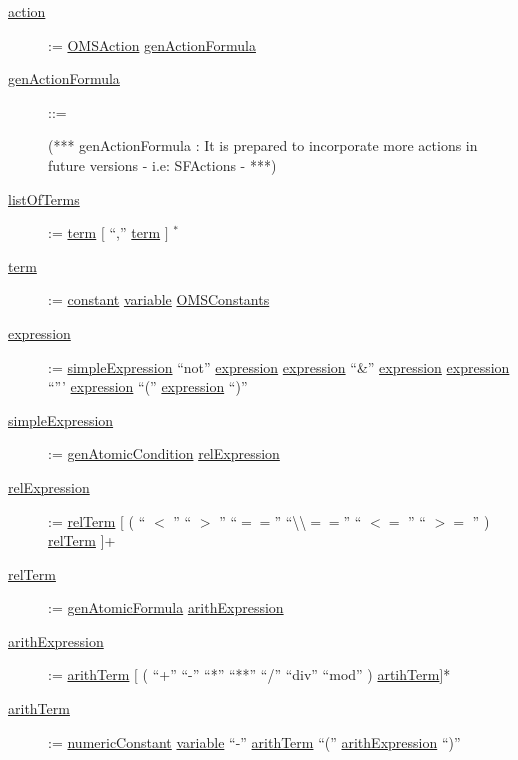 \begin{description}
\item[\underline{action}] := \underline{OMSAction} \textbar \underline{genActionFormula}

\item[\underline{genActionFormula}] ::= 

(*** genActionFormula : It is prepared to incorporate more actions in future versions - i.e: SFActions - ***)


\item[\underline{listOfTerms}] := \underline{term} $[$ ``,'' \underline{term} $]$ $^{*}$

\item[\underline{term}] := \underline{constant}  \textbar \underline{variable} \textbar \underline{OMSConstants}

\item[\underline{expression}] := \underline{simpleExpression} \textbar ``not'' \underline{expression} \textbar \underline{expression} ``\&'' \underline{expression} \textbar \underline{expression} ``\textbar''' \underline{expression} \textbar ``('' \underline{expression} ``)''

\item[\underline{simpleExpression}] := \underline{genAtomicCondition} \textbar \underline{relExpression}    

\item[\underline{relExpression}] := \underline{relTerm} $[$ ( `` $<$ '' \textbar `` $>$ '' \textbar ``$==$'' \textbar ``\textbackslash\textbackslash$==$'' `` $<=$ '' \textbar `` $>=$ '' ) \underline{relTerm} $]$+

\item[\underline{relTerm}] := \underline{genAtomicFormula} \textbar \underline{arithExpression}


\item[\underline{arithExpression}] := \underline{arithTerm} $[$ ( ``+''  \textbar  ``-''  \textbar  ``*''  \textbar  ``**''  \textbar ``/'' \textbar ``div'' \textbar ``mod'' ) \underline{artihTerm}$]$*

\item[\underline{arithTerm}] := \underline{numericConstant} \textbar \underline{variable} \textbar ``-'' \underline{arithTerm} \textbar ``('' \underline{arithExpression} ``)''


\end{description}
